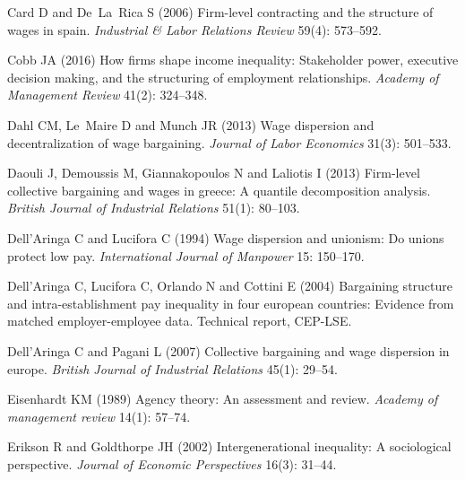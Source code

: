 \documentclass[Review,times,sageh,11pt]{sagej}
\begin{document}
\begin{thebibliography}{38}
Card D and De~La~Rica S (2006) Firm-level contracting and the structure of
  wages in spain.
\newblock \emph{Industrial \& Labor Relations Review} 59(4): 573--592.

Cobb JA (2016) How firms shape income inequality: Stakeholder power, executive
  decision making, and the structuring of employment relationships.
\newblock \emph{Academy of Management Review} 41(2): 324--348.

Dahl CM, Le~Maire D and Munch JR (2013) Wage dispersion and decentralization of
  wage bargaining.
\newblock \emph{Journal of Labor Economics} 31(3): 501--533.

Daouli J, Demoussis M, Giannakopoulos N and Laliotis I (2013) Firm-level
  collective bargaining and wages in greece: A quantile decomposition analysis.
\newblock \emph{British Journal of Industrial Relations} 51(1): 80--103.

{Dell'Aringa} C and Lucifora C (1994) Wage dispersion and unionism: Do unions
  protect low pay.
\newblock \emph{International Journal of Manpower} 15: 150--170.

{Dell'Aringa} C, Lucifora C, Orlando N and Cottini E (2004) Bargaining
  structure and intra-establishment pay inequality in four european countries:
  Evidence from matched employer-employee data.
\newblock Technical report, CEP-LSE.

{Dell'Aringa} C and Pagani L (2007) Collective bargaining and wage dispersion
  in europe.
\newblock \emph{British Journal of Industrial Relations} 45(1): 29--54.

Eisenhardt KM (1989) Agency theory: An assessment and review.
\newblock \emph{Academy of management review} 14(1): 57--74.

Erikson R and Goldthorpe JH (2002) Intergenerational inequality: A sociological
  perspective.
\newblock \emph{Journal of Economic Perspectives} 16(3): 31--44.


\end{thebibliography}
\end{document}
